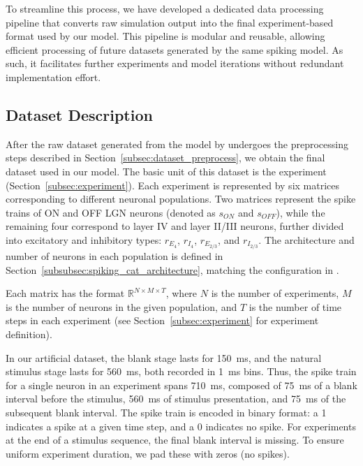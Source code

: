 To streamline this process, we have developed a dedicated data processing pipeline that converts raw simulation output into the final experiment-based format used by our model. This pipeline is modular and reusable, allowing efficient processing of future datasets generated by the same spiking model. As such, it facilitates further experiments and model iterations without redundant implementation effort.

\subsection{Dataset Description}
\label{subsec:dataset_description}

After the raw dataset generated from the model by \citet{antolik2024comprehensive} undergoes the preprocessing steps described in Section~\ref{subsec:dataset_preprocess}, we obtain the final dataset used in our model. The basic unit of this dataset is the experiment (Section~\ref{subsec:experiment}). Each experiment is represented by six matrices corresponding to different neuronal populations. Two matrices represent the spike trains of ON and OFF LGN neurons (denoted as $s_{ON}$ and $s_{OFF}$), while the remaining four correspond to layer IV and layer II/III neurons, further divided into excitatory and inhibitory types: $r_{E_{4}}$, $r_{I_{4}}$, $r_{E_{2/3}}$, and $r_{I_{2/3}}$. The architecture and number of neurons in each population is defined in Section~\ref{subsubsec:spiking_cat_architecture}, matching the configuration in \citet{antolik2024comprehensive}.

Each matrix has the format $\mathbb{R}^{N \times M \times T}$, where $N$ is the number of experiments, $M$ is the number of neurons in the given population, and $T$ is the number of time steps in each experiment (see Section~\ref{subsec:experiment} for experiment definition).

In our artificial dataset, the blank stage lasts for 150~ms, and the natural stimulus stage lasts for 560~ms, both recorded in 1~ms bins. Thus, the spike train for a single neuron in an experiment spans 710~ms, composed of 75~ms of a blank interval before the stimulus, 560~ms of stimulus presentation, and 75~ms of the subsequent blank interval. The spike train is encoded in binary format: a 1 indicates a spike at a given time step, and a 0 indicates no spike. For  experiments at the end of a stimulus sequence, the final blank interval is missing. To ensure uniform experiment duration, we pad these with zeros (no spikes).

